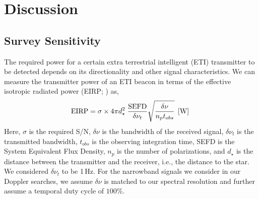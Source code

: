 \section{Discussion}\label{sec:discussion}
\subsection{Survey Sensitivity}
\label{sec:sensitivity}
The required power for a certain extra terrestrial intelligent (ETI) transmitter to be detected depends on its directionality and other signal characteristics. 
We can measure the transmitter power of an ETI beacon in terms of the effective isotropic radiated power (EIRP; \citealt{Enriquez:2017}) as,
\begin{equation}
    {\rm EIRP} = \sigma \times {4 \pi d_\star^2} \;\frac{{\rm SEFD}}{\delta{\nu_t}}\sqrt{\frac{\delta{\nu}}{n_{p}t_{obs}}}  \>\> \mathrm{[W]}\;
    \label{Eq:EIRP}
\end{equation}
Here, $\sigma$ is the required S/N, $\delta{\nu}$ is the bandwidth of the received signal, 
$\delta{\nu}_{t}$ is the transmitted bandwidth, $t_{obs}$ is the observing integration time, SEFD is the System Equivalent Flux Density, $n_p$ is the number of polarizations, 
and $d_\star$ is the distance between the transmitter and the receiver, i.e., the distance to the star. We considered $\delta{\nu}_{t}$ to be 1\,Hz. For the narrowband signals we consider in our Doppler searches, we assume $\delta{\nu}$ is matched to our spectral resolution and further assume a temporal duty cycle of $100\%$.

